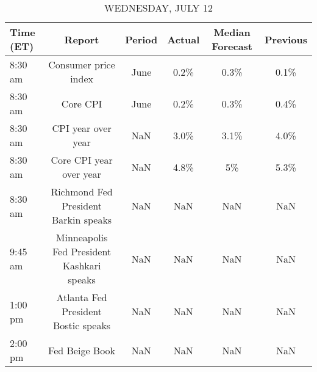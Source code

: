 \documentclass{article}%
\begin{document}
\begin{table}[htbp]%
\caption{WEDNESDAY, JULY 12}%
\centering%
\begin{adjustbox}{width=1\textwidth}%
\begin{tabular}{lccccc}
\toprule
Time (ET) &                                    Report & Period & Actual & Median Forecast & Previous \\
\midrule
  8:30 am &                      Consumer price index &   June &   0.2\% &            0.3\% &     0.1\% \\
  8:30 am &                                  Core CPI &   June &   0.2\% &            0.3\% &     0.4\% \\
  8:30 am &                        CPI year over year &    NaN &   3.0\% &            3.1\% &     4.0\% \\
  8:30 am &                   Core CPI year over year &    NaN &   4.8\% &              5\% &     5.3\% \\
  8:30 am &      Richmond Fed President Barkin speaks &    NaN &    NaN &             NaN &      NaN \\
  9:45 am & Minneapolis Fed President Kashkari speaks &    NaN &    NaN &             NaN &      NaN \\
  1:00 pm &       Atlanta Fed President Bostic speaks &    NaN &    NaN &             NaN &      NaN \\
  2:00 pm &                            Fed Beige Book &    NaN &    NaN &             NaN &      NaN \\
\bottomrule
\end{tabular}
%
\end{adjustbox}%
\end{table}

%
\end{document}
